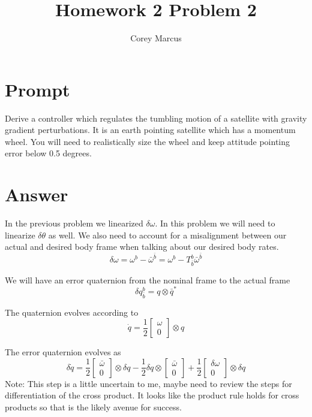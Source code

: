 \documentclass[]{article}
\title{Homework 2 Problem 2}
\author{Corey Marcus}
\begin{document}
\maketitle

\newcommand{\CrossProd}[1]{\left[ #1 \times \right]}
\newcommand{\VecToQuat}[1]{\begin{bmatrix} #1 \\ 0 \end{bmatrix}}

\section{Prompt}

Derive a controller which regulates the tumbling motion of a satellite with gravity gradient perturbations. It is an earth pointing satellite which has a momentum wheel. You will need to realistically size the wheel and keep attitude pointing error below 0.5 degrees.

\section{Answer}

In the previous problem we linearized $\delta \omega$. In this problem we will need to linearize $\delta \theta$ as well.
We also need to account for a misalignment between our actual and desired body frame when talking about our desired body rates.
\begin{equation}
	\delta \omega = \omega^{b} - \bar{\omega}^{\bar{b}} = \omega^b - T^{b}_{\bar{b}} \bar{\omega}^{\bar{b}}
\end{equation}

We will have an error quaternion from the nominal frame to the actual frame
\begin{equation}
	\delta q_{\bar{b}}^b = q \otimes \bar{q}^*
\end{equation}

The quaternion evolves according to
\begin{equation}
	\dot{q} = \frac{1}{2} \VecToQuat{\omega}  \otimes q
\end{equation}

The error quaternion evolves as
\begin{equation}
	\delta \dot{q} = \frac{1}{2} \VecToQuat{\bar{\omega}} \otimes \delta q - \frac{1}{2} \delta q \otimes \VecToQuat{\bar{\omega}} + \frac{1}{2} \VecToQuat{\delta \omega} \otimes \delta q
\end{equation}
Note: This step is a little uncertain to me, maybe need to review the steps for differentiation of the cross product. It looks like the product rule holds for cross products so that is the likely avenue for success.
\end{document}
